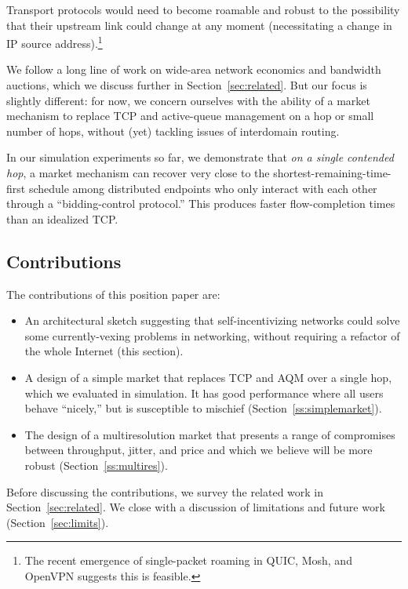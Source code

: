 Transport protocols would need to become roamable and robust to the
possibility that their upstream link could change at any moment
(necessitating a change in IP source address).\footnote{The recent
  emergence of single-packet roaming in QUIC, Mosh, and OpenVPN
  suggests this is feasible.}

We follow a long line of work on wide-area network economics and
bandwidth auctions, which we discuss further in
Section~\ref{sec:related}. But our focus is slightly different: for now, we concern ourselves
with the ability of a market mechanism to replace TCP and active-queue
management on a hop or small number of hops, without (yet) tackling
issues of interdomain routing.

In our simulation experiments so far, we demonstrate that \emph{on a
  single contended hop}, a market mechanism can recover very close to the
shortest-remaining-time-first schedule among distributed endpoints who
only interact with each other through a ``bidding-control protocol.''
This produces faster flow-completion times than an idealized TCP.

\subsection{Contributions}

The contributions of this position paper are:

\begin{itemize}

\item An architectural sketch suggesting that
  self-incentivizing networks could solve some currently-vexing problems in
  networking, without requiring a refactor of the whole Internet (this section).

\item A design of a simple market that replaces TCP and AQM over a
  single hop, which we evaluated in simulation. It has good
  performance where all users behave ``nicely,'' but is susceptible to
  mischief (Section~\ref{ss:simplemarket}).

\item The design of a multiresolution market that presents a range of
  compromises between throughput, jitter, and price and which we
  believe will be more robust (Section~\ref{ss:multires}).

\end{itemize}

Before discussing the contributions, we survey the related work in
Section~\ref{sec:related}. We close with a discussion of limitations
and future work (Section~\ref{sec:limits}).
